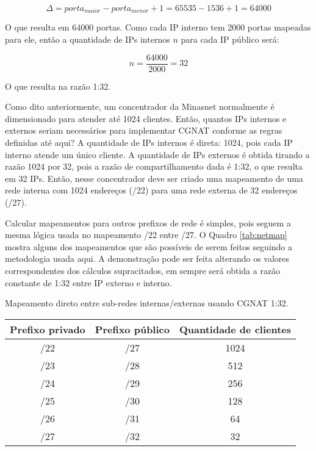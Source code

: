     \begin{equation}
        \Delta = porta_{maior} - porta_{menor} + 1
               = 65535 - 1536 + 1
               = 64000
    \end{equation}
    
    O que resulta em 64000 portas. Como cada IP interno tem 2000 portas mapeadas para ele, então a quantidade de IPs internos $ n $ para cada IP público será:

    \begin{equation}
        n = \frac{64000}{2000}
          = 32
    \end{equation}

    O que resulta na razão 1:32.

    Como dito anteriormente, um concentrador da Minasnet normalmente é dimensionado para atender até 1024 clientes. Então, quantos IPs internos e externos seriam necessários para implementar CGNAT conforme as regras definidas até aqui? A quantidade de IPs internos é direta: 1024, pois cada IP interno atende um único cliente. A quantidade de IPs externos é obtida tirando a razão 1024 por 32, pois a razão de compartilhamento dada é 1:32, o que resulta em 32 IPs. Então, nesse concentrador deve ser criado uma mapeamento de uma rede interna com 1024 endereços (/22) para uma rede externa de 32 endereços (/27).
    
    Calcular mapeamentos para outros prefixos de rede é simples, pois seguem a mesma lógica usada no mapeamento /22 entre /27. O Quadro \ref{tab:netmap} mostra alguns dos mapeamentos que são possíveis de serem feitos seguindo a metodologia usada aqui. A demonstração pode ser feita alterando os valores correspondentes dos cálculos supracitados, em sempre será obtida a razão constante de 1:32 entre IP externo e interno.

    \begin{quadro}[htb]
        \begin{center}
            \caption{Mapeamento direto entre sub-redes internas/externas usando CGNAT 1:32.} 
            \label{tab:netmap}
            \vspace{0.2cm}
            \footnotesize
            \begin{tabular}{|c|c|c|}
            \hline
            Prefixo privado & Prefixo público & Quantidade de clientes \\
            \hline
            \hline
            /22 & /27 & 1024 \\
            /23 & /28 & 512 \\
            /24 & /29 & 256 \\
            /25 & /30 & 128 \\
            /26 & /31 & 64 \\
            /27 & /32 & 32 \\
            \hline 
            \end{tabular}
        \end{center}
    \end{quadro}


